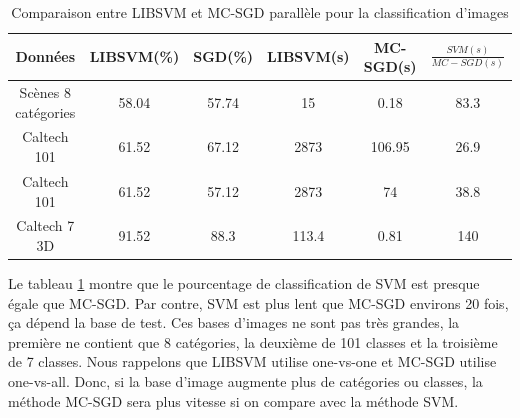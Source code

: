 \pagebreak
\begin{table}
\begin{center}
    \begin{tabular}{ | c | c | c | c | c | c |}
    \hline
    Données & LIBSVM(\%) & SGD(\%) & LIBSVM(s) & MC-SGD(s) & $\frac{SVM(s)}{MC-SGD(s)}$ \\ \hline
    
    Scènes 8 catégories & 58.04 & 57.74 & 15 & 0.18 & 83.3 \\ \hline
    
    Caltech 101 & 61.52 & 67.12 & 2873 & 106.95 & 26.9 \\ \hline    
    
    Caltech 101 & 61.52 & 57.12 & 2873 & 74 & 38.8 \\ \hline   
    
    Caltech 7 3D & 91.52 & 88.3 & 113.4 & 0.81 & 140 \\ \hline    
    
    \end{tabular}
\end{center}
\caption{Comparaison entre LIBSVM et MC-SGD parallèle pour la classification d'images}
\label{tab:pmcsvm-8scenes}
\end{table}

Le tableau \ref{tab:pmcsvm-8scenes} montre que le pourcentage de classification de SVM est presque égale que MC-SGD. Par contre, SVM est plus lent que MC-SGD environs 20 fois, ça dépend la base de test. Ces bases d'images ne sont pas très grandes, la première ne contient que 8 catégories, la deuxième de 101 classes et la troisième de 7 classes. Nous rappelons que LIBSVM utilise one-vs-one et MC-SGD utilise one-vs-all. Donc, si la base d'image augmente plus de catégories ou classes, la méthode MC-SGD sera plus vitesse si on compare avec la méthode SVM.



